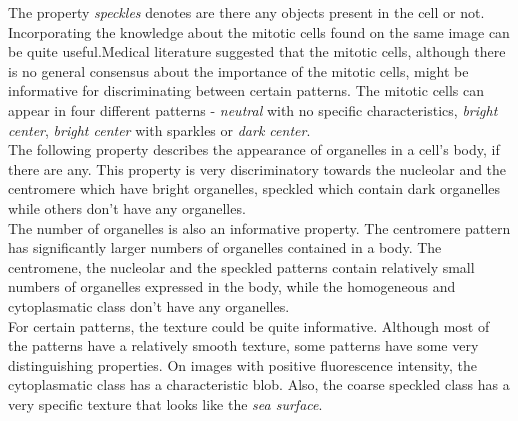 The property \textit{speckles} denotes are there any objects present in the cell or not. \\

Incorporating the knowledge about the mitotic cells found on the same image can be quite useful.Medical literature suggested that the mitotic cells, although there is no general consensus about the importance of the mitotic cells, might be informative for discriminating between certain patterns. The mitotic cells can appear in four different patterns - \textit{neutral} with no specific characteristics, \textit{bright center},  \textit{bright center} with sparkles or \textit{dark center}. \\

The following property describes the appearance of organelles in a cell's body, if there are any. This property is very discriminatory towards the nucleolar and the centromere which have bright organelles, speckled which contain dark organelles while others don't have any organelles. \\

The number of organelles is also an informative property. The centromere pattern has significantly larger numbers of organelles contained in a body. The centromene, the nucleolar and the speckled patterns contain relatively small numbers of organelles expressed in the body, while the homogeneous and cytoplasmatic class don't have any organelles. \\

For certain patterns, the texture could be quite informative. Although most of the patterns have a relatively smooth texture, some patterns have some very distinguishing properties. On images with positive fluorescence intensity, the cytoplasmatic class has a characteristic blob. Also, the coarse speckled class has a very specific texture that looks like the \textit{sea surface}. \\



